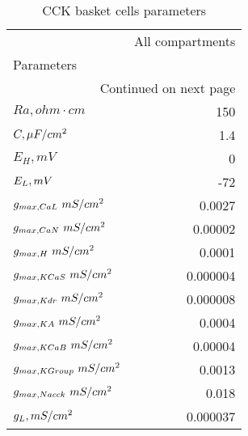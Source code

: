 \begin{longtable}{lr}
\caption{CCK basket cells parameters}\label{ca1_cckbas_cell_parameters}\\
\toprule
{} &     All compartments \\
Parameters      &          \\
\midrule
\endhead
\midrule
\multicolumn{2}{r}{{Continued on next page}} \\
\midrule
\endfoot

\bottomrule
\endlastfoot
$Ra,
 ohm \cdot cm$              &      150 \\
$C, \linebreak \mu F / cm^2$              &      1.4 \\
$E_{H}, mV$        &        0 \\
$E_L, \linebreak mV$       &      -72 \\
$g_{max, CaL    }\linebreak \  mS / cm^2$&   0.0027 \\
$g_{max, CaN    }\linebreak \  mS / cm^2$&  0.00002 \\
$g_{max, H     }\linebreak \  mS / cm^2$&   0.0001 \\
$g_{max, KCaS    }\linebreak \  mS / cm^2$& 0.000004 \\
$g_{max, Kdr }\linebreak \  mS / cm^2$& 0.000008 \\
$g_{max, KA     }\linebreak \  mS / cm^2$&   0.0004 \\
$g_{max, KCaB   }\linebreak \  mS / cm^2$&  0.00004 \\
$g_{max, KGroup }\linebreak \  mS / cm^2$&   0.0013 \\
$g_{max, Nacck  }\linebreak \  mS / cm^2$&    0.018 \\
$g_L, \linebreak mS / cm^2$    & 0.000037 \\
\end{longtable}
